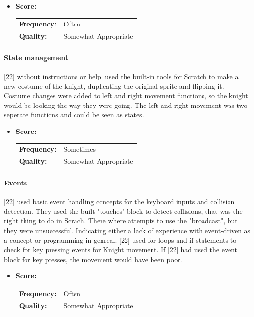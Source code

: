 \begin{itemize}
	\item \textbf{Score:}
	      \begin{tabular}{ll}
		      \textbf{Frequency:} & Often                \\
		      \textbf{Quality:}   & Somewhat Appropriate \\
	      \end{tabular}
\end{itemize}

\paragraph{State management}

[22] without instructions or help, used the built-in tools for Scratch to make a new costume of the knight, duplicating the original sprite and flipping it. Costume changes were added to left and right movement functions,  so the knight would be looking the way they were going. The left and right movement was two seperate functions and could be seen as states.



\begin{itemize}
	\item \textbf{Score:}
	      \begin{tabular}{ll}
		      \textbf{Frequency:} & Sometimes            \\
		      \textbf{Quality:}   & Somewhat Appropriate \\
	      \end{tabular}
\end{itemize}

\paragraph{Events}

[22] used basic event handling concepts for the keyboard inputs and collision detection. They used the built "touches" block to detect collisions, that was the right thing to do in Scrach.
There where attempts to use the "broadcast", but they were unsuccessful. Indicating either a lack of experience with event-driven as a concept or programming in genreal.
	[22] used for loops and if statements to check for key pressing events for Knight movement.
If [22] had used the event block for key presses, the movement would have been poor.


\begin{itemize}
	\item \textbf{Score:}
	      \begin{tabular}{ll}
		      \textbf{Frequency:} & Often                \\
		      \textbf{Quality:}   & Somewhat Appropriate \\
	      \end{tabular}
\end{itemize}



